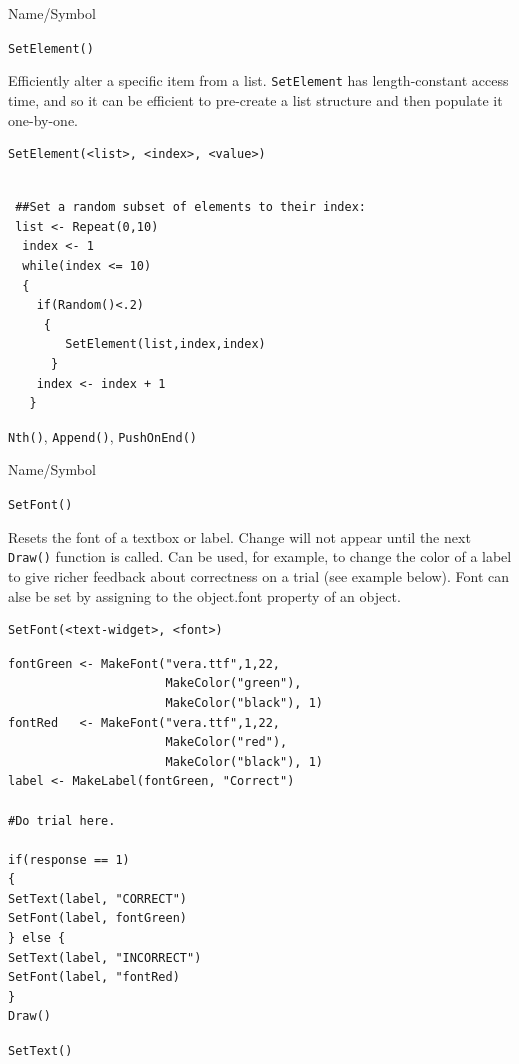 \begin{desc}{Name/Symbol}
\item[Name/Symbol] 	\verb+SetElement()+

\item[Description] Efficiently alter a specific item from a list.  \verb+SetElement+ has 
length-constant access time, and so it can be efficient to pre-create a list structure
and then populate it one-by-one.
	

\item[Usage]
\begin{verbatim}
SetElement(<list>, <index>, <value>)
\end{verbatim}

\item[Example]
\begin{verbatim}
 
 ##Set a random subset of elements to their index:
 list <- Repeat(0,10)
  index <- 1
  while(index <= 10)
  {
    if(Random()<.2)
     {
        SetElement(list,index,index)
      }
    index <- index + 1
   }

\end{verbatim}

\item[See Also]   	\verb+Nth()+, \verb+Append()+, \verb+PushOnEnd()+
\end{desc}


\begin{desc}{Name/Symbol}
\item[Name/Symbol] 	\verb+SetFont()+

\item[Description] Resets the font of a textbox or label.  Change will
  not appear until the next \verb+Draw()+ function is called.  Can be
  used, for example, to change the color of a label to give richer
  feedback about correctness on a trial (see example below).  Font can
alse be set by assigning to the object.font property of an object.

\item[Usage]
\begin{verbatim}
SetFont(<text-widget>, <font>)
\end{verbatim}

\item[Example]   	
\begin{verbatim}
fontGreen <- MakeFont("vera.ttf",1,22, 
                      MakeColor("green"),
                      MakeColor("black"), 1)
fontRed   <- MakeFont("vera.ttf",1,22,
                      MakeColor("red"),
                      MakeColor("black"), 1)
label <- MakeLabel(fontGreen, "Correct")

#Do trial here.       	

if(response == 1)
{
SetText(label, "CORRECT")
SetFont(label, fontGreen)
} else {
SetText(label, "INCORRECT")
SetFont(label, "fontRed)
}
Draw()
\end{verbatim}

\item[See Also]    	\verb+SetText()+
\end{desc}

